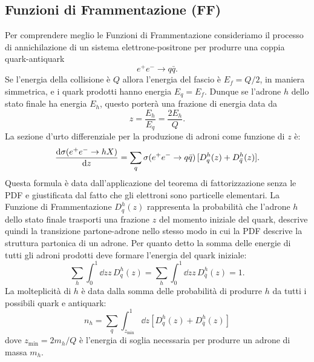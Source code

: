     \subsection{Funzioni di Frammentazione (FF)}
        Per comprendere meglio le Funzioni di Frammentazione consideriamo il processo di annichilazione di un sistema elettrone-positrone per produrre una coppia quark-antiquark~\cite{Vogt_2007}
        \begin{equation*}
            e^{+} e^{-} \to q \bar{q}.
        \end{equation*}
        Se l'energia della collisione è $Q$ allora l'energia del fascio è $E_f = Q/2$, in maniera simmetrica, e i quark prodotti hanno energia $E_q = E_f$. Dunque se l'adrone $h$ dello stato finale ha energia $E_h$, questo porterà una frazione di energia data da
        \begin{equation*}
            z = \frac{E_h}{E_q} = \frac{2 E_h}{Q}.
        \end{equation*}
        La sezione d'urto differenziale per la produzione di adroni come funzione di $z$ è:
        \begin{equation*}
            \dv{\sigma(e^{+} e^{-} \to h X)}{z} = \sum_{q}{\sigma(e^{+}e^{-} \to q \bar{q}) \, [D_{q}^{h}(z) + D_{\bar{q}}^{h}(z)]}.
        \end{equation*}
        Questa formula è data dall'applicazione del teorema di fattorizzazione senza le PDF e giustificata dal fatto che gli elettroni sono particelle elementari. La Funzione di Frammentazione $D_{q}^{h}(z)$ rappresenta la probabilità che l'adrone $h$ dello stato finale trasporti una frazione $z$ del momento iniziale del quark, descrive quindi la transizione partone-adrone nello stesso modo in cui la PDF descrive la struttura partonica di un adrone. Per quanto detto la somma delle energie di tutti gli adroni prodotti deve formare l'energia del quark iniziale:
        \begin{equation*}
            \sum_{h}{\int_{0}^{1}{\dd{z} z \, D_{q}^{h}(z)}} = \sum_{h}{ \int_{0}^{1}{\dd{z} z \, D_{\bar{q}}^{h}(z)}} = 1.
        \end{equation*}
        La molteplicità di $h$ è data dalla somma delle probabilità di produrre $h$ da tutti i possibili quark e antiquark:
        \begin{equation*}
            n_{h} = \sum_{q}{\int_{z_{\min}}^{1} \dd{z} [D_{q}^{h}(z) + D_{\bar{q}}^{h}(z)]}
        \end{equation*}
        dove $z_{\min} = 2 m_{h} / Q$ è l'energia di soglia necessaria per produrre un adrone di massa $m_{h}$.

